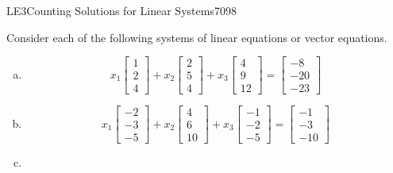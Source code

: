\begin{exercise}{LE3}{Counting Solutions for Linear Systems}{7098} 
\begin{exerciseStatement} 

 Consider each of the following systems of linear equations or vector equations. 

 

\begin{enumerate}[(a)]
\item  

 \[
              x_{1} \left[\begin{array}{c}
1 \\
2 \\
4
\end{array}\right] + x_{2} \left[\begin{array}{c}
2 \\
5 \\
4
\end{array}\right] + x_{3} \left[\begin{array}{c}
4 \\
9 \\
12
\end{array}\right] = \left[\begin{array}{c}
-8 \\
-20 \\
-23
\end{array}\right]
            \] 

 
\item  

 \[
              x_{1} \left[\begin{array}{c}
-2 \\
-3 \\
-5
\end{array}\right] + x_{2} \left[\begin{array}{c}
4 \\
6 \\
10
\end{array}\right] + x_{3} \left[\begin{array}{c}
-1 \\
-2 \\
-5
\end{array}\right] = \left[\begin{array}{c}
-1 \\
-3 \\
-10
\end{array}\right]
            \] 

 
\item  


\end{enumerate}
\end{exerciseStatement}
\end{exercise}
